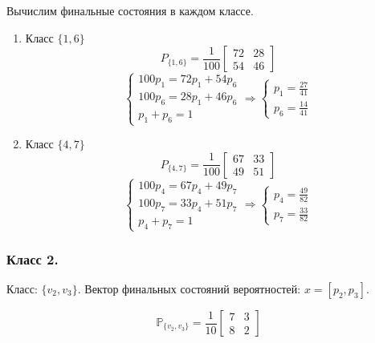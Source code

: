 Вычислим финальные состояния в каждом классе.
\begin{enumerate}
	\item Класс $\{ 1,6 \}$
	\[ P_{\{1,6\}} = \frac{1}{100}
	\begin{bmatrix}
	72 & 28 \\
	54 & 46
	\end{bmatrix}
	\]
	\[
	\begin{cases}
	100 p_1 = 72 p_1 + 54 p_6 \\
	100 p_6 = 28 p_1 + 46 p_6 \\
	p_1 + p_6 = 1
	\end{cases}
	\Rightarrow
	\begin{cases}
	p_1 = \frac{27}{41} \\
	p_6 = \frac{14}{41}
	\end{cases}
	\]
	\item Класс $\{ 4,7 \}$
	\[ P_{\{4,7\}} = \frac{1}{100}
	\begin{bmatrix}
	67 & 33 \\
	49 & 51
	\end{bmatrix}
	\]
	\[
	\begin{cases}
	100 p_4 = 67 p_4 + 49 p_7 \\
	100 p_7 = 33 p_4 + 51 p_7 \\
	p_4 + p_7 = 1
	\end{cases}
	\Rightarrow
	\begin{cases}
	p_4 = \frac{49}{82} \\
	p_7 = \frac{33}{82}
	\end{cases}
	\]
\end{enumerate}

\subsubsection*{Класс 2.}

\noindent Класс: $\{ v_2, v_3 \}$. Вектор финальных состояний вероятностей: $x = [p_2, p_3]$.

\[
\mathbb{P}_{ \{ v_2, v_3 \} } = \frac{1}{10}
\begin{bmatrix}
7 & 3 \\
8 & 2
\end{bmatrix}
\]

